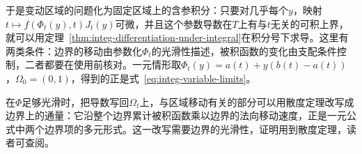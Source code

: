 于是变动区域的问题化为固定区域上的含参积分：只要对几乎每个$y$，映射$t\mapsto f(\Phi_t(y),t)J_t(y)$可微，并且这个参数导数在$T$上有与$t$无关的可积上界，就可以用定理~\ref{thm:integ-differentiation-under-integral}在积分号下求导。这里有两类条件：边界的移动由参数化$\Phi_t$的光滑性描述，被积函数的变化由支配条件控制，二者都要在使用前核对。一元情形取$\Phi_t(y)=a(t)+y(b(t)-a(t))$，$\Omega_0=(0,1)$，得到的正是式~\eqref{eq:integ-variable-limits}。

在$\Phi$足够光滑时，把导数写回$\Omega_t$上，与区域移动有关的部分可以用散度定理改写成边界上的通量：它沿整个边界累计被积函数乘以边界的法向移动速度，正是一元公式中两个边界项的多元形式。这一改写需要边界的光滑性，证明用到散度定理，读者可查阅。
